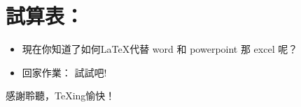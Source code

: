 \documentclass{beamer}
\begin{document}
\section{試算表：\protect{}}

\begin{frame}[fragile]{\insertsection}
\begin{itemize}
\item 現在你知道了如何\LaTeX{}代替 word 和 powerpoint 那 excel 呢？
\item 回家作業： 試試吧!
\end{itemize}
\end{frame}

\begin{frame}
\begin{center}
感謝聆聽，\TeX{}ing愉快！
\end{center}
\end{frame}
\end{document}
